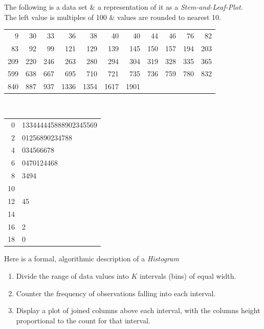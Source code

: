 \documentclass[11pt,a4paper]{article}
\begin{document}
The following is a data set \& a representation of it as a \textit{Stem-and-Leaf-Plot}.\\
The left value is multiples of 100 \& values are rounded to nearest 10.\\
\begin{tabular}{rrrrrrrrrrr}
9&30&33&36&38&40&40&44&46&76&82\\
83&92&99&121&129&139&145&150&157&194&203\\
209&220&246&263&280&294&304&319&328&335&365\\
599&638&667&695&710&721&735&736&759&780&832\\
840&887&937&1336&1354&1617&1901
\end{tabular}\\
\begin{tabular}{r|l}
0&133444445888902345569\\
2&01256890234788\\
4&034566678\\
6&0470124468\\
8&3494\\
10\\
12&45\\
14\\
16&2\\
18&0
\end{tabular}

Here is a formal, algorithmic description of a \textit{Histogram}
\begin{enumerate}[label=\roman*)]
	\item Divide the range of data values into $K$ intervals (bins) of equal width.
	\item Counter the frequency of observations falling into each interval.
	\item Display a plot of joined columns above each interval, with the columns height proportional to the count for that interval.
\end{enumerate}
\end{document}
